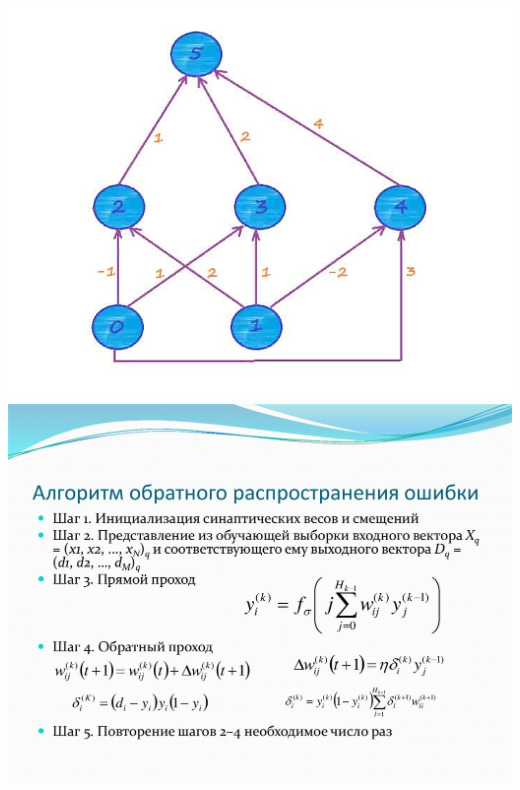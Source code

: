 \documentclass[12pt,a4paper]{report}
\begin{document}
\includegraphics{weight}
\includegraphics{weight2}
\end{document}
